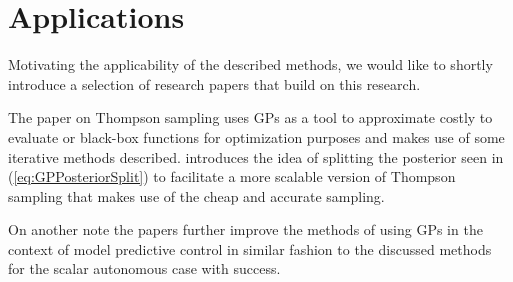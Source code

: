 \section{Applications}
Motivating the applicability of the described methods, we would like to shortly introduce a selection of research papers that build on this research. \newline

The paper \cite{ApplicPaper1:ThompsonSamplingWithGP} on Thompson sampling uses GPs as a tool to approximate costly to evaluate or black-box functions for optimization purposes and makes use of some iterative methods described. \cite{Paper6:ThompsonSamplingWithPosteriorSplit} introduces the idea of splitting the posterior seen in (\ref{eq:GPPosteriorSplit}) to facilitate a more scalable version of Thompson sampling that makes use of the cheap and accurate sampling. \newline

On another note the papers \cite{ApplicPaper2:GPwithBackoff,ApplicPaper3:PredictionScenarios} further improve the methods of using GPs in the context of model predictive control in similar fashion to the discussed methods for the scalar autonomous case with success. 
